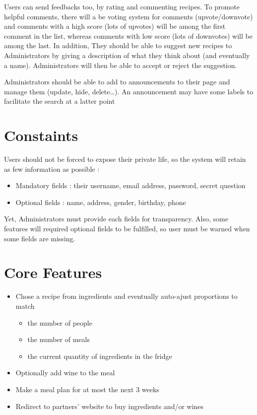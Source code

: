 \documentclass[english,12pt,twoside,a4paper]{report}
\begin{document}
Users can send feedbacks too, by rating and commenting recipes. To promote helpful comments, there will a be voting system for comments (upvote/downvote) and comments with a high score (lots of upvotes) will be among the first comment in the list, whereas comments with low score (lots of downvotes) will be among the last. In addition, They should be able to suggest new recipes to Administrators by giving a description of what they think about (and eventually a name). Administrators will then be able to accept or reject the suggestion.

Administrators should be able to add to announcements to their page and manage them (update, hide, delete…). An announcement may have some labels to facilitate the search at a latter point

\section{Constaints}
Users should not be forced to expose their private life, so the system will retain as few information as possible :
\begin{itemize}
  \item Mandatory fields : their username, email address, password, secret question
  \item Optional fields : name, address, gender, birthday, phone
\end{itemize}

\noindent
Yet, Administrators must provide each fields for transparency. Also, some features will required optional fields to be fulfilled, so user must be warned when some fields are missing.

\section{Core Features}
\begin{itemize}
  \item Chose a recipe from ingredients and eventually auto-ajust proportions to match
        \begin{itemize}
          \item the number of people
          \item the number of meals
          \item the current quantity of ingredients in the fridge
        \end{itemize}
  \item Optionally add wine to the meal
  \item Make a meal plan for at most the next 3 weeks
  \item Redirect to partners' website to buy ingredients and/or wines
\end{itemize}
\end{document}
